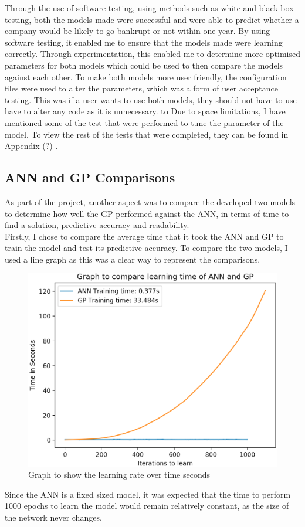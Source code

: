 \documentclass[11pt]{article}
\begin{document}
Through the use of software testing, using methods such as white and black box testing, both the models made were successful and were able to predict whether a company would be likely to go bankrupt or not within one year. By using software testing, it enabled me to ensure that the models made were learning correctly. Through experimentation, this enabled me to determine more optimised parameters for both models which could be used to then compare the models against each other. To make both models more user friendly, the configuration files were used to alter the parameters, which was a form of user acceptance testing. This was if a user wants to use both models, they should not have to use have to alter any code as it is unnecessary. to Due to space limitations, I have mentioned some of the test that were performed to tune the parameter of the model. To view the rest of the tests that were completed, they can be found in Appendix (?) .
\subsection{ANN and GP Comparisons}
As part of the project, another aspect was to compare the developed two models to determine how well the GP performed against the ANN, in terms of time to find a solution, predictive accuracy and readability. \\

Firstly, I chose to compare the average time that it took the ANN and GP to train the model and test its predictive accuracy. To compare the two models, I used a line graph as this was a clear way to represent the comparisons.


\begin{figure}[h]
\centering
\includegraphics[scale = .45]{learning_rates}
\caption{Graph to show the learning rate over time seconds} 
\end{figure}
Since the ANN is a fixed sized model, it was expected that the time to perform 1000 epochs to learn the model would remain relatively constant, as the size of the network never changes. 
\end{document}
